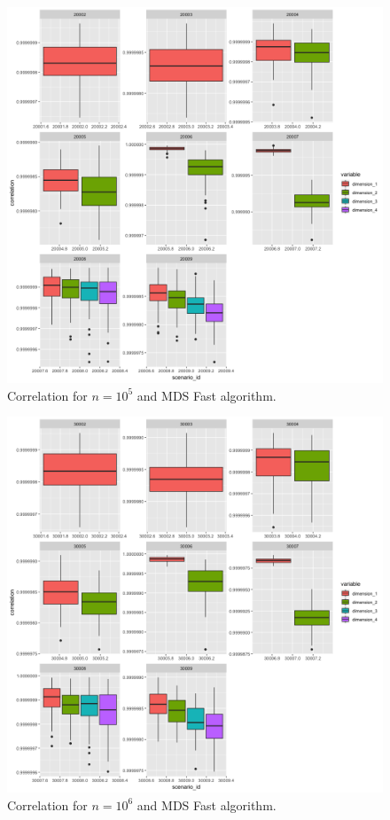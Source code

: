\documentclass[11pt]{report}
\begin{document}
\begin{figure}[ht]
\centering
    \includegraphics[scale = 1.5]{./images/fast_correlation_100000.png}
    \caption{Correlation for $n = 10^5$ and MDS Fast algorithm.}
    \label{fast_correlation_100000}
\end{figure}

\begin{figure}[ht]
\centering
    \includegraphics[scale = 1.5]{./images/fast_correlation_1000000.png}
    \caption{Correlation for $n = 10^6$ and MDS Fast algorithm.}
    \label{fast_correlation_1000000}
\end{figure}
\end{document}
